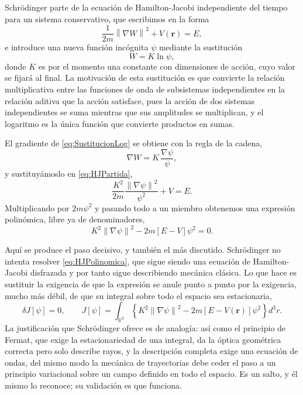         Schrödinger parte de la ecuación de Hamilton-Jacobi independiente del tiempo para un sistema conservativo, que escribimos en la forma
        \begin{equation}\label{eq:HJPartida}
            \frac{1}{2m}\left\|\nabla W\right\|^{2} + V(\mathbf{r}) = E,
        \end{equation}
        e introduce una nueva función incógnita $\psi$ mediante la sustitución
        \begin{equation}\label{eq:SustitucionLog}
            W = K\ln\psi,
        \end{equation}
        donde $K$ es por el momento una constante con dimensiones de acción, cuyo valor se fijará al final. La motivación de esta sustitución es que convierte la relación multiplicativa entre las funciones de onda de subsistemas independientes en la relación aditiva que la acción satisface, pues la acción de dos sistemas independientes se suma mientras que sus amplitudes se multiplican, y el logaritmo es la única función que convierte productos en sumas.

        El gradiente de \eqref{eq:SustitucionLog} se obtiene con la regla de la cadena,
        \begin{equation}\label{eq:GradienteLog}
            \nabla W = K\,\frac{\nabla\psi}{\psi},
        \end{equation}
        y sustituyámoslo en \eqref{eq:HJPartida},
        \begin{equation}\label{eq:HJSustituida}
            \frac{K^{2}}{2m}\frac{\left\|\nabla\psi\right\|^{2}}{\psi^{2}} + V = E .
        \end{equation}
        Multiplicando por $2m\psi^{2}$ y pasando todo a un miembro obtenemos una expresión polinómica, libre ya de denominadores,
        \begin{equation}\label{eq:HJPolinomica}
            K^{2}\left\|\nabla\psi\right\|^{2} - 2m\left[E - V\right]\psi^{2} = 0 .
        \end{equation}

        Aquí se produce el paso decisivo, y también el más discutido. Schrödinger no intenta resolver \eqref{eq:HJPolinomica}, que sigue siendo una ecuación de Hamilton-Jacobi disfrazada y por tanto sigue describiendo mecánica clásica. Lo que hace es sustituir la exigencia de que la expresión se anule punto a punto por la exigencia, mucho más débil, de que su integral sobre todo el espacio sea estacionaria,
        \begin{equation}\label{eq:FuncionalSchrodinger}
            \delta J[\psi] = 0,
            \qquad
            J[\psi] = \int_{\mathbb{R}^{3}}\left\{K^{2}\left\|\nabla\psi\right\|^{2} - 2m\left[E - V(\mathbf{r})\right]\psi^{2}\right\}d^{3}r .
        \end{equation}
        La justificación que Schrödinger ofrece es de analogía: así como el principio de Fermat, que exige la estacionariedad de una integral, da la óptica geométrica correcta pero solo describe rayos, y la descripción completa exige una ecuación de ondas, del mismo modo la mecánica de trayectorias debe ceder el paso a un principio variacional sobre un campo definido en todo el espacio. Es un salto, y él mismo lo reconoce; su validación es que funciona.

